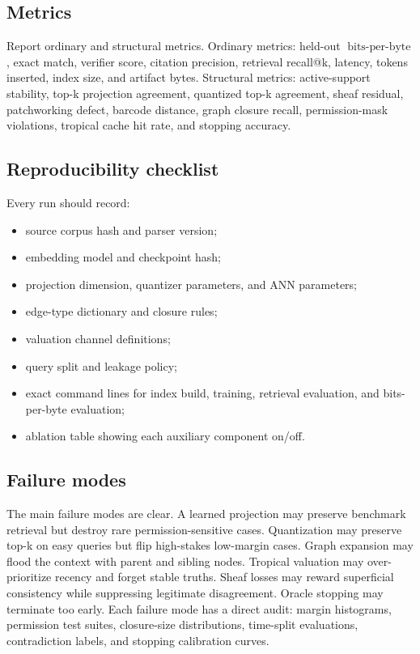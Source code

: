\documentclass[11pt]{article}
\theoremstyle{definition}
\theoremstyle{remark}
\newcommand{\bits}{\ensuremath{\operatorname{bits\text{-}per\text{-}byte}}}
\begin{document}
\subsection{Metrics}

Report ordinary and structural metrics. Ordinary metrics: held-out \bits, exact match, verifier score, citation precision, retrieval recall@k, latency, tokens inserted, index size, and artifact bytes. Structural metrics: active-support stability, top-k projection agreement, quantized top-k agreement, sheaf residual, patchworking defect, barcode distance, graph closure recall, permission-mask violations, tropical cache hit rate, and stopping accuracy.

\subsection{Reproducibility checklist}

Every run should record:
\begin{itemize}
    \item source corpus hash and parser version;
    \item embedding model and checkpoint hash;
    \item projection dimension, quantizer parameters, and ANN parameters;
    \item edge-type dictionary and closure rules;
    \item valuation channel definitions;
    \item query split and leakage policy;
    \item exact command lines for index build, training, retrieval evaluation, and bits-per-byte evaluation;
    \item ablation table showing each auxiliary component on/off.
\end{itemize}

\subsection{Failure modes}

The main failure modes are clear. A learned projection may preserve benchmark retrieval but destroy rare permission-sensitive cases. Quantization may preserve top-k on easy queries but flip high-stakes low-margin cases. Graph expansion may flood the context with parent and sibling nodes. Tropical valuation may over-prioritize recency and forget stable truths. Sheaf losses may reward superficial consistency while suppressing legitimate disagreement. Oracle stopping may terminate too early. Each failure mode has a direct audit: margin histograms, permission test suites, closure-size distributions, time-split evaluations, contradiction labels, and stopping calibration curves.
\end{document}
